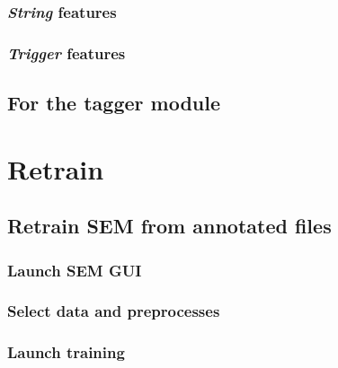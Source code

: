 \documentclass[12pt]{article}
\begin{document}
            \subsubsection{\textit{String} features}
            \label{subsubsec:feature-string}
            

            \subsubsection{\textit{Trigger} features}
            \label{subsubsec:feature-triggered}
            

        \subsection{For the tagger module}
        \label{sec:config-tagger}
        
    
    \section{Retrain \SEM}
    \label{sec:retrain-sem}
    
    
        \subsection{Retrain SEM from annotated files}
        \label{subsec:retrain-sem-annotated}
        
            \subsubsection{Launch SEM GUI}
            \label{subsec:launch-sem-gui}
            
            
            \subsubsection{Select data and preprocesses}
            \label{subsec:data-and-preprocess}
            
            
            \subsubsection{Launch training}
            \label{subsubsec:train-SEM-from-annotated}
            
        
\end{document}
